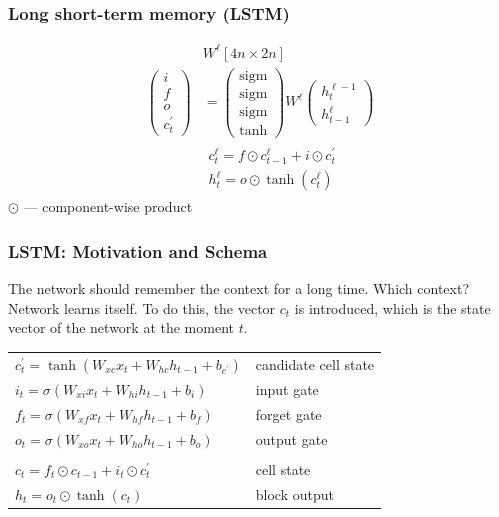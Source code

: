 \documentclass[fullscreen=true, bookmarks=true, hyperref={pdfencoding=unicode}]{beamer}
\begin{document}
\begin{frame}[t]
  \frametitle{Long short-term memory (LSTM)}

  \begin{align*}
     &W^\ell [4n\times 2n] \\
    \left(\begin{array}{c}
    i \\ f \\ o \\ c_t^\prime
    \end{array}\right) &=
    \left(\begin{array}{c}
    \text{sigm} \\ \text{sigm} \\ \text{sigm} \\ \tanh
    \end{array}\right)
    W^\ell
    \left(\begin{array}{c}
    h_t^{\ell-1} \\ h_{t-1}^{\ell}
    \end{array}\right) \\
    &\begin{array}{l}
    c_t^\ell = f \odot c_{t-1}^\ell + i \odot c_t^\prime \\
    h_t^\ell = o \odot \tanh(c_t^\ell)
    \end{array}
  \end{align*}
  \center $\odot$ — component-wise product
\end{frame}


\begin{frame}
\frametitle{LSTM: Motivation and Schema}

   The network should remember the context for a long time. Which context? Network learns itself.
   To do this, the vector $c_t$ is introduced, which is the state vector of the network at the moment $t$.

  \vspace{1cm}
  \begin{tabular}{ll}
    $c_t^\prime = \tanh(W_{xc}x_t + W_{hc}h_{t-1} + b_{c^\prime})$ & candidate cell state \\
    $i_t = \sigma(W_{xi}x_t + W_{hi}h_{t-1} + b_{i})$ & input gate \\
    $f_t = \sigma(W_{xf}x_t + W_{hf}h_{t-1} + b_{f})$ & forget gate \\
    $o_t = \sigma(W_{xo}x_t + W_{ho}h_{t-1} + b_{o})$ & output gate \\
     & \\
    $c_t = f_t \odot c_{t-1} + i_t \odot c_t^\prime$ & cell state \\
    $h_t = o_t \odot \tanh(c_t)$ & block output
  \end{tabular}
\end{frame}
\end{document}

